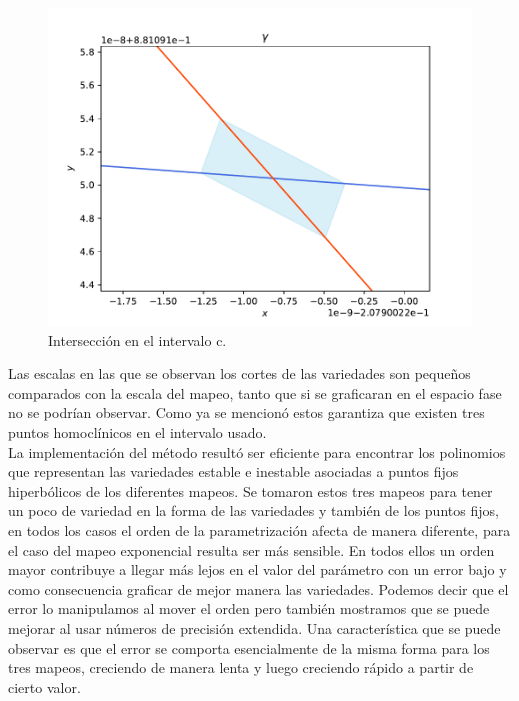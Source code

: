 \begin{figure}[H]
\centering
\includegraphics[scale=0.4]{cruce_c}
\caption{Intersección en el intervalo c.}
\label{jung_corte3}
\end{figure}

Las escalas en las que se observan los cortes de las variedades son pequeños comparados con la escala del mapeo, tanto que si se graficaran en el espacio fase no se podrían observar. Como ya se mencionó estos garantiza que existen tres puntos homoclínicos en el intervalo usado. \\


La implementación del método resultó ser eficiente para encontrar los polinomios que representan las variedades estable e inestable asociadas a puntos fijos hiperbólicos de los diferentes mapeos. Se tomaron estos tres mapeos para tener un poco de variedad en la forma de las variedades y también de los puntos fijos, en todos los casos el orden de la parametrización afecta de manera diferente, para el caso del mapeo exponencial resulta ser más sensible. En todos ellos un orden mayor contribuye a llegar más lejos en el valor del parámetro con un error bajo y como consecuencia graficar de mejor manera las variedades. Podemos decir que el error lo manipulamos al mover el orden pero también mostramos que se puede mejorar al usar números de precisión extendida. Una característica que se puede observar es que el error se comporta esencialmente de la misma forma para los tres mapeos, creciendo de manera lenta y luego creciendo rápido a partir de cierto valor. \\


